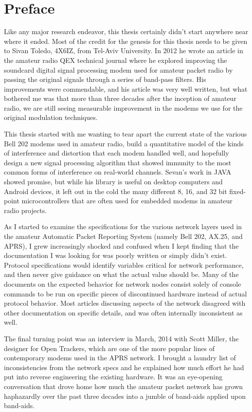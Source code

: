 \chapter{Preface}

Like any major research endeavor, this thesis certainly didn't start anywhere near
where it ended.
Most of the credit for the genesis for this thesis needs to be given to 
Sivan Toledo, 4X6IZ, from Tel-Aviv University. In 2012 he wrote an article in the
amateur radio QEX technical journal where he explored improving the soundcard 
digital signal processing modem used for amateur packet radio by passing the 
original signals through a series of band-pass filters. His improvements were
commendable, and his article was very well written, but what bothered me was that 
more than three decades after the inception of amateur radio, we are still seeing
measurable improvement in the modems we use for the original modulation techniques.

This thesis started with me wanting to tear apart the current state of the various
Bell 202 modems used in amateur radio, build a quantitative model of the kinds of
interference and distortion that each modem handled well, and hopefully design
a new signal processing algorithm that showed immunity to the most common forms of
interference on real-world channels. Sevan's work in JAVA showed promise, but 
while his library is useful on desktop computers and Android devices, it left 
out in the cold the many different 8, 16, and 32 bit fixed-point microcontrollers
that are often used for embedded modems in amateur radio projects.

As I started to examine the specifications for the various network layers used
in the amateur Automatic Packet Reporting System (namely Bell 202, AX.25, and
APRS), I grew increasingly shocked and confused when I kept finding that the
documentation I was looking for was poorly written or simply didn't exist. 
Protocol specifications would identify variables critical for network performance,
and then never give guidance on what the actual value should be.
Many of the documents
on the expected behavior for network nodes consist solely of console commands
to be run on specific pieces of discontinued hardware instead of actual protocol
behavior.
Most articles discussing aspects of the network disagreed with 
other documentation on specific details,
and was often internally inconsistent as well.

The final turning point was an interview in March, 2014 with Scott Miller, the
designer for Open Trackers, 
which are one of the more popular lines of contemporary modems used in the APRS
network.
I brought a laundry list of inconsistencies from the network specs and he
explained how much effort he had put into reverse engineering the existing 
hardware. It was an eye-opening conversation that drove home how much the 
amateur packet network has grown haphazardly over the past three decades into
a jumble of band-aids applied upon band-aids.

